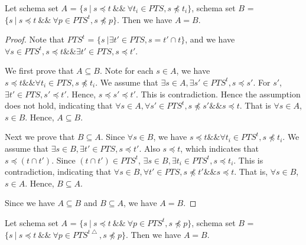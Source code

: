\begin{proposition}\label{pro:healthysintequal}
Let schema set $A$ = $\{ s\ |\ s \preceq t\ \&\&\  \forall t_{i} \in PTS, s \npreceq t_{i} \} $,  schema set $B$ = $\{ s\ |\ s \preceq t\ \&\&\ \forall p \in PTS^{t}, s \npreceq p \}$. Then we have $A = B$.
\end{proposition}

\begin{proof}
Note that $PTS^{t}$ = $\{ s\ |\exists t' \in PTS, s =  t' \cap t \}$, and we have $\forall s \in PTS^{t}, s \preceq t \&\& \exists t' \in PTS, s \preceq t'$.

We first prove that $A \subseteq B$. Note for each $s \in A$, we have $s \preceq t \&\& \forall t_{i} \in PTS, s \npreceq t_{i}$. We assume that $\exists s \in A, \exists s' \in PTS^{t}, s \preceq s'$. For $s'$, $\exists t' \in PTS, s' \preceq t'$. Hence, $s  \preceq s' \preceq t'$. This is contradiction. Hence the assumption does not hold, indicating that $\forall s \in A, \forall s' \in PTS^{t}, s \npreceq s' \&\& s \preceq t$. That is $\forall s \in A$, $s \in B$. Hence, $A \subseteq B$.

Next we prove that $B \subseteq A$. Since $\forall s \in B$, we have $s \preceq t \&\& \forall t_{i} \in  PTS^{t}, s \npreceq t_{i}$. We assume that $\exists s \in B, \exists t' \in PTS, s \preceq t'$. Also $s \preceq t$, which indicates that $s \preceq (t \cap t')$.  Since $(t \cap t') \in PTS^{t} $, $\exists s \in B, \exists t_{i} \in PTS^{t}, s \preceq t_{i}$. This is contradiction, indicating that  $\forall s \in B, \forall t' \in PTS, s \npreceq t' \&\& s \preceq t$. That is, $\forall s \in B$, $s \in A$. Hence, $B \subseteq A$.

Since we have $A \subseteq B$ and $B \subseteq A$, we have $A = B$.
\end{proof}

\begin{proposition}\label{pro:healthysintequal2}
Let schema set $A$ = $\{ s\ |\ s \preceq t\ \&\&\ \forall p \in PTS^{t}, s \npreceq p \}$, schema set $B$ = $\{ s\ |\ s \preceq t\ \&\&\ \forall p \in PTS^{t\bigtriangleup}, s \npreceq p \}$. Then we have $A = B$.
\end{proposition}

